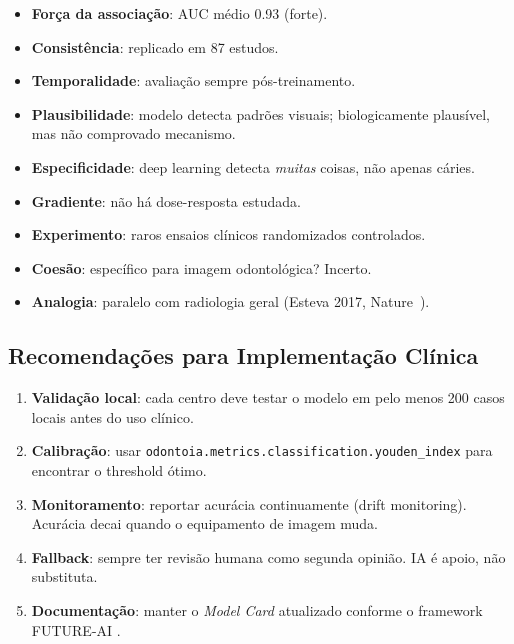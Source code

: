\begin{itemize}
    \item[$\checkmark$] \textbf{Força da associação}: AUC médio 0.93 (forte).
    \item[$\checkmark$] \textbf{Consistência}: replicado em 87 estudos.
    \item[$\checkmark$] \textbf{Temporalidade}: avaliação sempre pós-treinamento.
    \item[$\sim$] \textbf{Plausibilidade}: modelo detecta padrões
    visuais; biologicamente plausível, mas não comprovado mecanismo.
    \item[$\times$] \textbf{Especificidade}: deep learning detecta
    \emph{muitas} coisas, não apenas cáries.
    \item[$\times$] \textbf{Gradiente}: não há dose-resposta estudada.
    \item[$\times$] \textbf{Experimento}: raros ensaios clínicos
    randomizados controlados.
    \item[$\times$] \textbf{Coesão}: específico para imagem odontológica?
    Incerto.
    \item[$\sim$] \textbf{Analogia}: paralelo com radiologia geral
    (Esteva 2017, Nature~\cite{esteva2017nature}).
\end{itemize}


\subsection*{Recomendações para Implementação Clínica}

\begin{enumerate}
    \item \textbf{Validação local}: cada centro deve testar o modelo
    em pelo menos 200 casos locais antes do uso clínico.
    \item \textbf{Calibração}: usar \texttt{odontoia.metrics.classification.youden\_index}
    para encontrar o threshold ótimo.
    \item \textbf{Monitoramento}: reportar acurácia continuamente
    (drift monitoring). Acurácia decai quando o equipamento de
    imagem muda.
    \item \textbf{Fallback}: sempre ter revisão humana como
    segunda opinião. IA é apoio, não substituta.
    \item \textbf{Documentação}: manter o \emph{Model Card} atualizado
    conforme o framework FUTURE-AI \cite{futureai2025}.
\end{enumerate}

